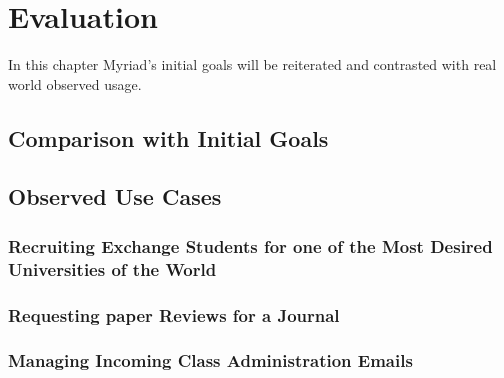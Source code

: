\chapter{Evaluation}
\label{chapter:Evaluation}

In this chapter Myriad's initial goals will be reiterated and contrasted with real world observed usage.

\section{Comparison with Initial Goals}

\section{Observed Use Cases}

\subsection{Recruiting Exchange Students for one of the Most Desired Universities of the World}

\subsection{Requesting paper Reviews for a Journal}

\subsection{Managing Incoming Class Administration Emails}


